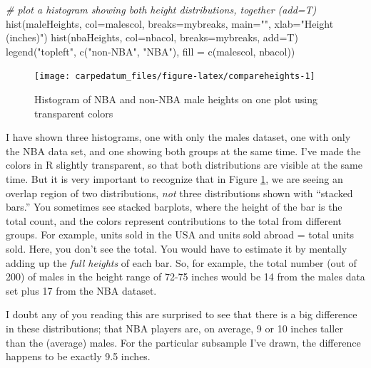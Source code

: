 \documentclass[
  openany]{book}
\newenvironment{Shaded}{\begin{snugshade}}{\end{snugshade}}
\newcommand{\AttributeTok}[1]{\textcolor[rgb]{0.77,0.63,0.00}{#1}}
\newcommand{\CommentTok}[1]{\textcolor[rgb]{0.56,0.35,0.01}{\textit{#1}}}
\newcommand{\FunctionTok}[1]{\textcolor[rgb]{0.00,0.00,0.00}{#1}}
\newcommand{\NormalTok}[1]{#1}
\newcommand{\StringTok}[1]{\textcolor[rgb]{0.31,0.60,0.02}{#1}}
\begin{document}
\begin{Shaded}
\begin{Highlighting}[]
\CommentTok{\# plot a histogram showing both height distributions, together (add=T)}
\FunctionTok{hist}\NormalTok{(maleHeights, }\AttributeTok{col=}\NormalTok{malescol, }\AttributeTok{breaks=}\NormalTok{mybreaks, }
          \AttributeTok{main=}\StringTok{""}\NormalTok{, }\AttributeTok{xlab=}\StringTok{"Height (inches)"}\NormalTok{)}
\FunctionTok{hist}\NormalTok{(nbaHeights, }\AttributeTok{col=}\NormalTok{nbacol, }\AttributeTok{breaks=}\NormalTok{mybreaks, }\AttributeTok{add=}\NormalTok{T)}
\FunctionTok{legend}\NormalTok{(}\StringTok{"topleft"}\NormalTok{, }\FunctionTok{c}\NormalTok{(}\StringTok{"non{-}NBA"}\NormalTok{, }\StringTok{"NBA"}\NormalTok{), }\AttributeTok{fill =} \FunctionTok{c}\NormalTok{(malescol, nbacol))}
\end{Highlighting}
\end{Shaded}

\begin{figure}

{\centering \texttt{[image: carpedatum\_files/figure-latex/compareheights-1]}

}

\caption{Histogram of NBA and non-NBA male heights on one plot using transparent colors}\label{fig:compareheights}
\end{figure}

I have shown three histograms, one with only the males dataset, one with only the NBA data set, and one showing both groups at the same time. I've made the colors in R slightly transparent, so that both distributions are visible at the same time. But it is very important to recognize that in Figure \ref{fig:compareheights}, we are seeing an overlap region of two distributions, \emph{not} three distributions shown with ``stacked bars.'' You sometimes see stacked barplots, where the height of the bar is the total count, and the colors represent contributions to the total from different groups. For example, units sold in the USA and units sold abroad = total units sold. Here, you don't see the total. You would have to estimate it by mentally adding up the \emph{full heights} of each bar. So, for example, the total number (out of 200) of males in the height range of 72-75 inches would be 14 from the males data set plus 17 from the NBA dataset.

I doubt any of you reading this are surprised to see that there is a big difference in these distributions; that NBA players are, on average, 9 or 10 inches taller than the (average) males. For the particular subsample I've drawn, the difference happens to be exactly 9.5 inches.
\end{document}
